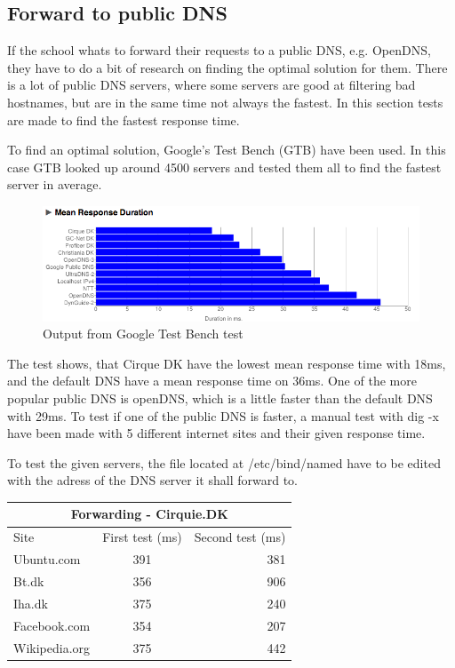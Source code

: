 \documentclass[Preamble]{subfiles}
\begin{document}
\subsection{Forward to public DNS}
If the school whats to forward their requests to a public DNS, e.g. OpenDNS, they have to do a bit of research on finding the optimal solution for them. There is a lot of public DNS servers, where some servers are good at filtering bad hostnames, but are in the same time not always the fastest. In this section tests are made to find the fastest response time.

To find an optimal solution, Google's Test Bench (GTB) have been used. In this case GTB looked up around 4500 servers and tested them all to find the fastest server in average.

\begin{figure}[hbtp]
\centering
\includegraphics[scale=0.5]{Figurer/NamebenchTest.png}
\caption{Output from Google Test Bench test}
\end{figure}

The test shows, that Cirque DK have the lowest mean response time with 18ms, and the default   DNS have a mean response time on 36ms. One of the more popular public DNS is openDNS, which is a little faster than the default DNS with 29ms. To test if one of the public DNS is faster, a manual test with dig -x have been made with 5 different internet sites and their given response time. 

To test the given servers, the file located at /etc/bind/named have to be edited with the adress of the DNS server it shall forward to. 

\begin{center}
  \begin{tabular}{ l | c  | r}
    \multicolumn{3}{c}{Forwarding - Cirquie.DK}  \\
	\hline Site & First test (ms) & Second test (ms) \\     
    \hline
    Ubuntu.com & 391 & 381  \\ \hline
    Bt.dk & 356 & 906  \\ \hline
	Iha.dk & 375 & 240 \\ \hline
	Facebook.com & 354 &	207 \\ \hline
	Wikipedia.org & 375 & 442 \\ \hline
  \end{tabular}
\end{center}
\end{document}
